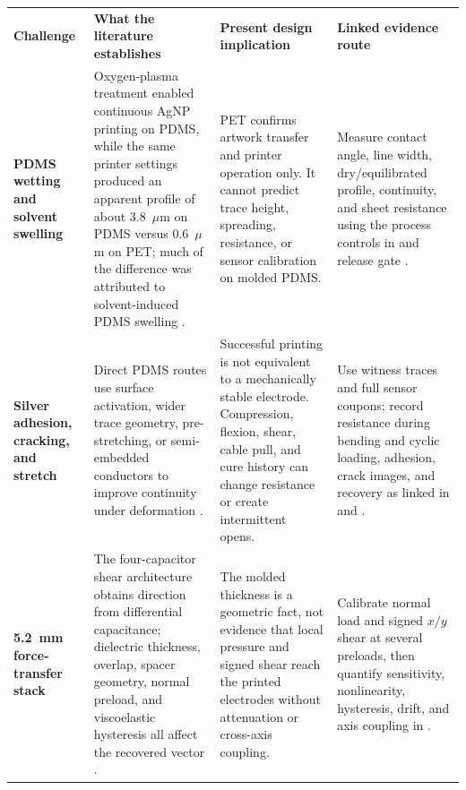 \vspace{0.42em}
\begingroup
\fontsize{7.15}{8.35}\selectfont
\setlength{\tabcolsep}{2.25pt}\renewcommand{\arraystretch}{1.045}
\begin{tabularx}{\linewidth}{>{\raggedright\arraybackslash\bfseries\color{AUBRed}}p{2.38cm}Y Y Y}
\color{white}\textbf{Challenge} &
\color{white}\textbf{What the literature establishes} &
\color{white}\textbf{Present design implication} &
\color{white}\textbf{Linked evidence route} \\
PDMS wetting and solvent swelling &
Oxygen-plasma treatment enabled continuous AgNP printing on PDMS, while the
same printer settings produced an apparent profile of about 3.8~$\mu$m on
PDMS versus 0.6~$\mu$m on PET; much of the difference was attributed to
solvent-induced PDMS swelling \cite{albrecht2018stretch}. &
PET confirms artwork transfer and printer operation only. It cannot predict
trace height, spreading, resistance, or sensor calibration on molded PDMS. &
Measure contact angle, line width, dry/equilibrated profile, continuity, and
sheet resistance using the process controls in
 and release gate
. \\
Silver adhesion, cracking, and stretch &
Direct PDMS routes use surface activation, wider trace geometry,
pre-stretching, or semi-embedded conductors to improve continuity under
deformation \cite{sun2016,q4abukhalaf2018,q4abukhalaf2019}. &
Successful printing is not equivalent to a mechanically stable electrode.
Compression, flexion, shear, cable pull, and cure history can change resistance
or create intermittent opens. &
Use witness traces and full sensor coupons; record resistance during bending
and cyclic loading, adhesion, crack images, and recovery as linked in
 and
. \\
5.2~mm force-transfer stack &
The four-capacitor shear architecture obtains direction from differential
capacitance; dielectric thickness, overlap, spacer geometry, normal preload,
and viscoelastic hysteresis all affect the recovered vector
\cite{albrecht2019}. &
The molded thickness is a geometric fact, not evidence that local pressure and
signed shear reach the printed electrodes without attenuation or cross-axis
coupling. &
Calibrate normal load and signed $x/y$ shear at several preloads, then quantify
sensitivity, nonlinearity, hysteresis, drift, and axis coupling in
. \\

\end{tabularx}
